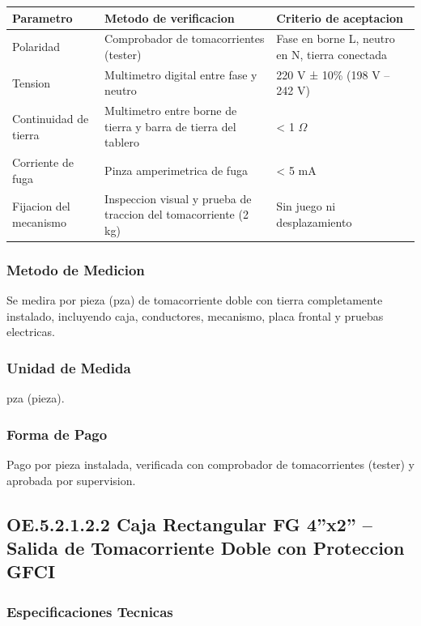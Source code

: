 \begin{longtable}{L{4.5cm} L{4.5cm} L{4.5cm}}
\toprule
\textbf{Parametro} & \textbf{Metodo de verificacion} & \textbf{Criterio de aceptacion} \\
\midrule
Polaridad & Comprobador de tomacorrientes (tester) & Fase en borne L, neutro en N, tierra conectada \\
Tension & Multimetro digital entre fase y neutro & 220 V ± 10\% (198 V -- 242 V) \\
Continuidad de tierra & Multimetro entre borne de tierra y barra de tierra del tablero & < 1 $\Omega$ \\
Corriente de fuga & Pinza amperimetrica de fuga & < 5 mA \\
Fijacion del mecanismo & Inspeccion visual y prueba de traccion del tomacorriente (2 kg) & Sin juego ni desplazamiento \\
\bottomrule
\end{longtable}

\subsubsection{Metodo de Medicion}

Se medira por pieza (pza) de tomacorriente doble con tierra completamente instalado, incluyendo caja, conductores, mecanismo, placa frontal y pruebas electricas.

\subsubsection{Unidad de Medida}

pza (pieza).

\subsubsection{Forma de Pago}

Pago por pieza instalada, verificada con comprobador de tomacorrientes (tester) y aprobada por supervision.

\subsection{OE.5.2.1.2.2 Caja Rectangular FG 4''x2'' -- Salida de Tomacorriente Doble con Proteccion GFCI}

\subsubsection{Especificaciones Tecnicas}

